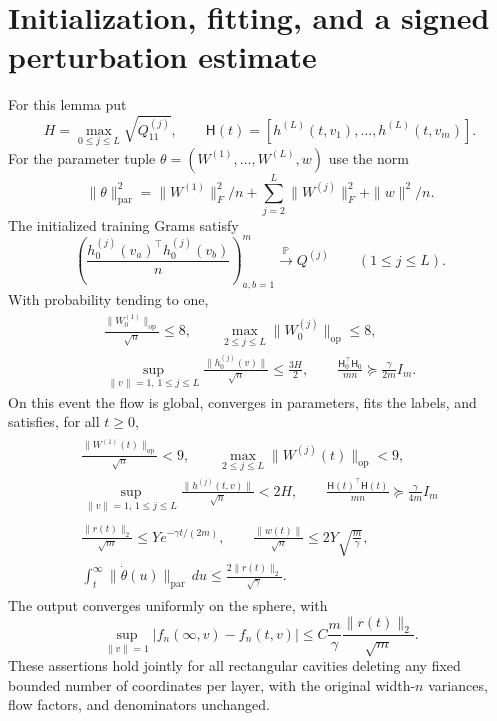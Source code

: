 \section{Initialization, fitting, and a signed perturbation estimate}
\label{cp:fitting-section}

\begin{lemma}
\label{cp:fit}
For this lemma put
\[
 H=\max_{0\le j\le L}\sqrt{Q^{(j)}_{11}},\qquad
 \mathsf H(t)=[h^{(L)}(t,v_1),\ldots,h^{(L)}(t,v_m)].
\]
For the parameter tuple
$\theta=(W^{(1)},\ldots,W^{(L)},w)$ use the norm
\[
\|\theta\|_{\mathrm{par}}^2
 =\|W^{(1)}\|_F^2/n+\sum_{j=2}^L\|W^{(j)}\|_F^2+\|w\|^2/n.
\]
The initialized training Grams satisfy
\begin{equation}
 \left(\frac{h_0^{(j)}(v_a)^\top h_0^{(j)}(v_b)}n\right)_{a,b=1}^m
 \xrightarrow{\mathbb P}Q^{(j)}
 \qquad(1\le j\le L).
 \label{cp:eq-initial-gram-limit}
\end{equation}
With probability tending to one,
\begin{equation}
 \begin{gathered}
 \frac{\|W_0^{(1)}\|_{\mathrm{op}}}{\sqrt n}\le8,\qquad
 \max_{2\le j\le L}\|W_0^{(j)}\|_{\mathrm{op}}\le8,\\
 \sup_{\|v\|=1,\,1\le j\le L}\frac{\|h_0^{(j)}(v)\|}{\sqrt n}
 \le\frac{3H}{2},\qquad
 \frac{\mathsf H_0^\top\mathsf H_0}{mn}\succeq\frac{\gamma}{2m}I_m.
 \end{gathered}
 \label{cp:eq-initialization-event}
\end{equation}
On this event the flow is global, converges in parameters, fits the labels,
and satisfies, for all $t\ge0$,
\begin{gather}
 \begin{gathered}
 \frac{\|W^{(1)}(t)\|_{\mathrm{op}}}{\sqrt n}<9,\qquad
 \max_{2\le j\le L}\|W^{(j)}(t)\|_{\mathrm{op}}<9,\\
 \sup_{\|v\|=1,\,1\le j\le L}\frac{\|h^{(j)}(t,v)\|}{\sqrt n}<2H,\qquad
 \frac{\mathsf H(t)^\top\mathsf H(t)}{mn}\succeq\frac{\gamma}{4m}I_m
 \end{gathered}
 \label{cp:eq-real-tube}\\
 \begin{gathered}
 \frac{\|r(t)\|_2}{\sqrt m}\le Ye^{-\gamma t/(2m)},\qquad
 \frac{\|w(t)\|}{\sqrt n}\le2Y\sqrt{\frac m\gamma},\\
 \int_t^\infty\|\dot\theta(u)\|_{\mathrm{par}}\,du
       \le\frac{2\|r(t)\|_2}{\sqrt\gamma}.
 \end{gathered}
 \label{cp:eq-dense-tail}
\end{gather}
The output converges uniformly on the sphere, with
\begin{equation}
 \sup_{\|v\|=1}|f_n(\infty,v)-f_n(t,v)|
 \le C\frac m\gamma\frac{\|r(t)\|_2}{\sqrt m}.
 \label{cp:eq-dense-output-tail}
\end{equation}
These assertions hold jointly for all rectangular cavities deleting any
fixed bounded number of coordinates per layer, with the original width-$n$
variances, flow factors, and denominators unchanged.
\end{lemma}


